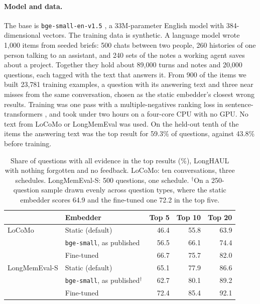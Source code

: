 \documentclass[11pt]{article}
\begin{document}
\paragraph{Model and data.} The base is \texttt{bge-small-en-v1.5}
\citep{xiao2023bge}, a 33M-parameter English model with 384-dimensional
vectors. The training data is synthetic. A language model wrote 1{,}000
items from seeded briefs: 500 chats between two people, 260 histories
of one person talking to an assistant, and 240 sets of the notes a
working agent saves about a project. Together they hold about 89{,}000
turns and notes and 20{,}000 questions, each tagged with the text that
answers it. From 900 of the items we built 23{,}781 training examples,
a question with its answering text and three near misses from the same
conversation, chosen as the static embedder's closest wrong results.
Training was one pass with a multiple-negatives ranking loss
\citep{henderson2017mnrl} in sentence-transformers
\citep{reimers2019sbert}, and took under two hours on a four-core CPU
with no GPU. No text from LoCoMo or LongMemEval was used. On the
held-out tenth of the items the answering text was the top result for 59.3\% of
questions, against 43.8\% before training.

\begin{table}[t]
\centering
\small
\begin{tabular}{llrrr}
\toprule
 & Embedder & Top 5 & Top 10 & Top 20 \\
\midrule
LoCoMo & Static (default) & 46.4 & 55.8 & 63.9 \\
 & \texttt{bge-small}, as published & 56.5 & 66.1 & 74.4 \\
 & Fine-tuned & 66.7 & 75.7 & 82.0 \\
\midrule
LongMemEval-S & Static (default) & 65.1 & 77.9 & 86.6 \\
 & \texttt{bge-small}, as published$^\dagger$ & 62.7 & 80.1 & 89.2 \\
 & Fine-tuned & 72.4 & 85.4 & 92.1 \\
\bottomrule
\end{tabular}
\caption{Share of questions with all evidence in the top results (\%),
LongHAUL with nothing forgotten and no feedback. LoCoMo: ten
conversations, three schedules. LongMemEval-S: 500 questions, one
schedule. $^\dagger$On a 250-question sample drawn evenly across
question types, where the static embedder scores 64.9 and the
fine-tuned one 72.2 in the top five.}
\label{tab:embedder}
\end{table}
\end{document}
